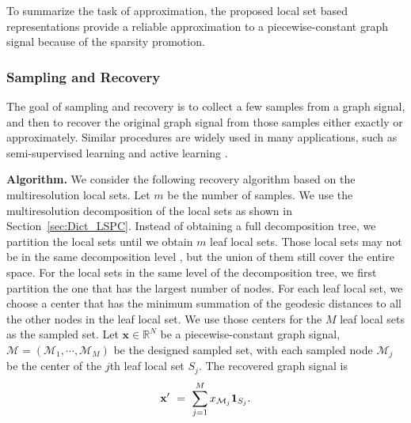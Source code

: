 \documentclass[journal,twocolumn,10pt]{IEEEtran}
\theoremstyle{definition}
\newcommand{\mypar}[1]{{\bf #1.}}
\newcommand{\R}{\ensuremath{\mathbb{R}}}
\def\x{\mathbf{x}}
\def\M{\mathcal{M}}
\begin{document}
To summarize the task of approximation, the proposed local set based representations provide a reliable approximation to a piecewise-constant graph signal because of the sparsity promotion.




\subsubsection{Sampling and Recovery}
\label{sec:SR}
The goal of sampling and recovery is to collect a few samples from a graph signal, and then to recover the original graph signal from those samples either exactly or approximately. Similar procedures are widely used in many applications, such as semi-supervised learning and active learning . 


\mypar{Algorithm}
We consider the following recovery algorithm based on the multiresolution local sets. Let $m$ be the number of samples.
 We use the multiresolution decomposition of the local sets as shown in Section~\ref{sec:Dict_LSPC}.
 Instead of obtaining a full decomposition tree, we partition the local sets until we obtain $m$ leaf local sets. Those local sets may not be in the same decomposition level , but the union of them still cover the entire space. For the local sets in the same level of the decomposition tree, we first partition the one that has the largest number of nodes. For each leaf local set, we choose a center that has the minimum summation of the geodesic distances to all the other nodes in the leaf local set. We use those centers for the $M$  leaf local sets as the sampled set. Let $\x \in \R^N$ be a piecewise-constant graph signal, $\M = (\M_1, \cdots, \M_M)$ be the designed sampled set, with each sampled node $\M_j$ be the center of the $j$th leaf local set $S_j$. The recovered graph signal is 
\begin{equation*}
\x' \ = \   \sum_{j=1}^{M}  x_{\M_j} {\bf 1}_{S_j}.
\end{equation*}
\end{document}
